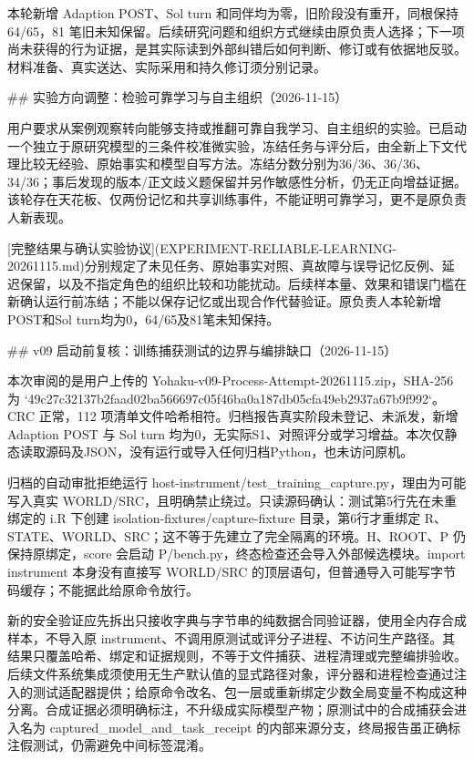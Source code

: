 本轮新增 Adaption POST、Sol turn 和同伴均为零，旧阶段没有重开，同根保持 64/65，81 笔旧未知保留。后续研究问题和组织方式继续由原负责人选择；下一项尚未获得的行为证据，是其实际读到外部纠错后如何判断、修订或有依据地反驳。材料准备、真实送达、实际采用和持久修订须分别记录。


## 实验方向调整：检验可靠学习与自主组织（2026-11-15）

用户要求从案例观察转向能够支持或推翻可靠自我学习、自主组织的实验。已启动一个独立于原研究模型的三条件校准微实验，冻结任务与评分后，由全新上下文代理比较无经验、原始事实和模型自写方法。冻结分数分别为36/36、36/36、34/36；事后发现的版本/正文歧义题保留并另作敏感性分析，仍无正向增益证据。该轮存在天花板、仅两份记忆和共享训练事件，不能证明可靠学习，更不是原负责人新表现。

[完整结果与确认实验协议](EXPERIMENT-RELIABLE-LEARNING-20261115.md)分别规定了未见任务、原始事实对照、真故障与误导记忆反例、延迟保留，以及不指定角色的组织比较和功能扰动。后续样本量、效果和错误门槛在新确认运行前冻结；不能以保存记忆或出现合作代替验证。原负责人本轮新增POST和Sol turn均为0，64/65及81笔未知保持。


## v09 启动前复核：训练捕获测试的边界与编排缺口（2026-11-15）

本次审阅的是用户上传的 Yohaku-v09-Process-Attempt-20261115.zip，SHA-256 为 `49c27c32137b2faad02ba566697c05f46ba0a187db05cfa49eb2937a67b9f992`。CRC 正常，112 项清单文件哈希相符。归档报告真实阶段未登记、未派发，新增 Adaption POST 与 Sol turn 均为0，无实际S1、对照评分或学习增益。本次仅静态读取源码及JSON，没有运行或导入任何归档Python，也未访问原机。

归档的自动审批拒绝运行 host-instrument/test_training_capture.py，理由为可能写入真实 WORLD/SRC，且明确禁止绕过。只读源码确认：测试第5行先在未重绑定的 i.R 下创建 isolation-fixtures/capture-fixture 目录，第6行才重绑定 R、STATE、WORLD、SRC；这不等于先建立了完全隔离的环境。H、ROOT、P 仍保持原绑定，score 会启动 P/bench.py，终态检查还会导入外部候选模块。import instrument 本身没有直接写 WORLD/SRC 的顶层语句，但普通导入可能写字节码缓存；不能据此给原命令放行。

新的安全验证应先拆出只接收字典与字节串的纯数据合同验证器，使用全内存合成样本，不导入原 instrument、不调用原测试或评分子进程、不访问生产路径。其结果只覆盖哈希、绑定和证据规则，不等于文件捕获、进程清理或完整编排验收。后续文件系统集成须使用无生产默认值的显式路径对象，评分器和进程检查通过注入的测试适配器提供；给原命令改名、包一层或重新绑定少数全局变量不构成这种分离。合成证据必须明确标注，不升级成实际模型产物；原测试中的合成捕获会进入名为 captured_model_and_task_receipt 的内部来源分支，终局报告虽正确标注假测试，仍需避免中间标签混淆。

